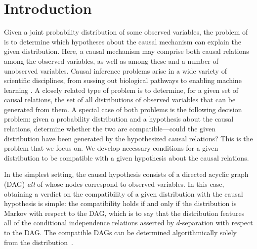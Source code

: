 \documentclass[aps,english,superscriptaddress,onecolumn,twoside,longbibliography,pra,floatfix,fleqn,nofootinbib]{revtex4-1}%
\newcommand*{\tblue}[1]{{\color{MidnightBlue}{\textbf{#1}}}}
\theoremstyle{definition}
\begin{document}
\maketitle
\tableofcontents

\section{Introduction}

Given a joint probability distribution of some observed variables, the problem of \tblue{causal inference} is to determine which hypotheses about the causal mechanism can explain the given distribution. Here, a causal mechanism may comprise both causal relations among the observed variables, as well as among these and a number of unobserved variables.
 Causal inference problems arise in a wide variety of scientific disciplines, from sussing out biological pathways to enabling machine learning \cite{pearl2009causality,spirtes2011causation,studeny2005probabilistic,koller2009probabilistic}. A closely related type of problem is to determine, for a given set of causal relations, the set of all distributions of observed variables that can be generated from them.   
A special case of both problems is the following decision problem: given a probability distribution and a hypothesis about the causal relations, determine whether the two are compatible---could the given distribution have been generated by the hypothesized causal relations? This is the problem that we focus on.
We develop necessary conditions for a given distribution to be compatible with a given hypothesis about the causal relations.


In the simplest setting, the causal hypothesis consists of a directed acyclic graph (DAG) {\em all} of whose nodes correspond to observed variables. In this case, obtaining a verdict on the compatibility of a given distribution with the causal hypothesis is simple: the compatibility holds if and only if the distribution is Markov with respect to the DAG, which is to say that the distribution features all of the conditional independence relations asserted by $d$-separation with respect to the DAG. 
The compatible DAGs can be determined algorithmically solely from the distribution~\cite{pearl2009causality}.
\end{document}
